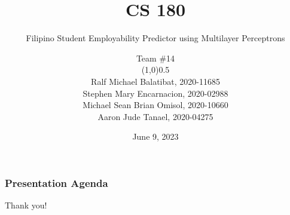 \documentclass[11pt]{beamer}
\begin{document}
	\author[Team \#14]{
		Team \#14
		\begin{center}
   	 \line(1,0){0.5\linewidth}
		\end{center}
		{\scriptsize%
		Ralf Michael Balatibat, 2020-11685\\
		Stephen Mary Encarnacion, 2020-02988\\
		Michael Sean Brian Omisol, 2020-10660\\
		Aaron Jude Tanael, 2020-04275\\
		}
	}
	\title{CS 180}
	\subtitle{Filipino Student Employability Predictor using Multilayer Perceptrons}
	\date{June 9, 2023}

	\begin{frame}
		\maketitle
	\end{frame}
	
	\begin{frame}
	\frametitle{Presentation Agenda}
	\tableofcontents
	\end{frame}

	
	
	
	

	\begin{frame}
	\begin{center}
	Thank you!
	\end{center}
	\end{frame}
\end{document}
